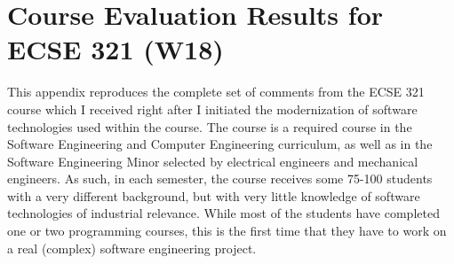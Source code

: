 \appendix
\chapter{Course Evaluation Results for ECSE 321 (W18)}

This appendix reproduces the complete set of comments from the ECSE 321 course which I received right after I initiated the modernization of software technologies used within the course. The course is a required course in the Software Engineering and Computer Engineering curriculum, as well as in the Software Engineering Minor selected by electrical engineers and mechanical engineers. As such, in each semester, the course receives some 75-100 students with a very different background, but with very little knowledge of software technologies of industrial relevance. While most of the students have completed one or two programming courses, this is the first time that they have to work on a real (complex) software engineering project. 


